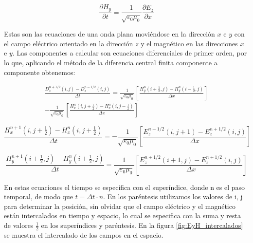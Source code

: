 \documentclass[11pt,a4paper,twoside,pdf]{article}
\numberwithin{equation}{section}
\begin{document}
\begin{equation}
\frac{\partial H_{y}}{\partial t}=\frac{1}{\sqrt{\varepsilon_{0}\mu_{0}}}\frac{\partial E_{z}}{\partial x}
\end{equation}

Estas son las ecuaciones de una onda plana moviéndose en la dirección $x$ e $y$ con el campo eléctrico orientado en la dirección $z$ y el magnético en las direcciones $x$ e $y$. Las componentes a calcular son ecuaciones diferenciales de primer orden, por lo que, aplicando el método de la diferencia central finita componente a componente obtenemos:

\begin{equation}
\begin{split}
\frac{D^{n+1/2}_{z}(i,j)-D^{n-1/2}_{z}(i,j)}{\Delta t}=\frac{1}{\sqrt{\varepsilon_{0}\mu_{0}}}\left[\frac{H^{n}_{y}(i+\frac{1}{2},j)-H^{n}_{y}(i-\frac{1}{2},j)}{\Delta x}\right]  \\
-\frac{1}{\sqrt{\varepsilon_{0}\mu_{0}}}\left[\frac{H^{n}_{x}(i,j+\frac{1}{2})-H^{n}_{x}(i,j-\frac{1}{2})}{\Delta x}\right] 
\end{split}
\end{equation}

\begin{equation}
\frac{H^{n+1}_{x}(i,j+\frac{1}{2})-H^{n}_{x}(i,j+\frac{1}{2})}{\Delta t}=-\frac{1}{\sqrt{\varepsilon_{0}\mu_{0}}}\left[\frac{E^{n+1/2}_{z}(i,j+1)-E^{n+1/2}_{z}(i,j)}{\Delta x}\right] 
\end{equation}

\begin{equation} 
\frac{H^{n+1}_{y}(i+\frac{1}{2},j)-H^{n}_{y}(i+\frac{1}{2},j)}{\Delta t}=\frac{1}{\sqrt{\varepsilon_{0}\mu_{0}}}\left[\frac{E^{n+1/2}_{z}(i+1,j)-E^{n+1/2}_{z}(i,j)}{\Delta x}\right] 
\end{equation}

En estas ecuaciones el tiempo se especifica con el superíndice, donde n es el paso temporal, de modo que $t=\Delta t\cdot n$. En los paréntesis utilizamos los valores de i, j para determinar la posición, sin olvidar que el campo eléctrico y el magnético están intercalados en tiempo y espacio, lo cual se especifica con la suma y resta de valores $\frac{1}{2}$ en los superíndices y paréntesis. En la figura \ref{fig:EyH_intercalados} se muestra el intercalado de los campos en el espacio.
\end{document}
